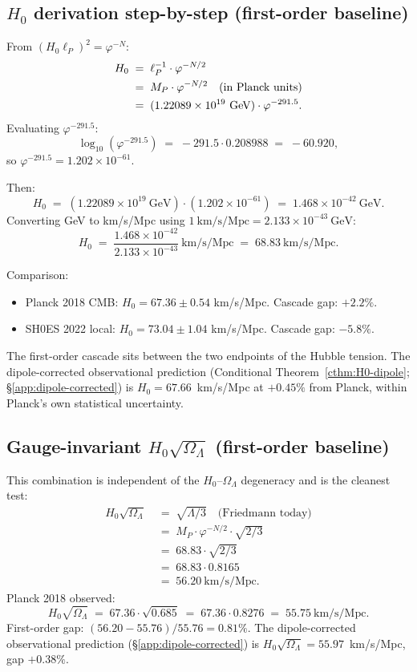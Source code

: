 \documentclass[11pt]{article}
\theoremstyle{plain}
\theoremstyle{definition}
\theoremstyle{remark}
\begin{document}
\subsection{$H_0$ derivation step-by-step (first-order baseline)}\label{app:h0-derivation}

From $(H_0 \ell_P)^2 = \varphi^{-N}$:
\begin{align}
  H_0 \;&=\; \ell_P^{-1} \cdot \varphi^{-N/2} \notag \\
       \;&=\; M_P \cdot \varphi^{-N/2} \quad \text{(in Planck units)} \notag \\
       \;&=\; (1.22089 \times 10^{19}~\text{GeV}) \cdot \varphi^{-291.5}. \label{eq:H0-derivation}
\end{align}
Evaluating $\varphi^{-291.5}$:
\[
  \log_{10}(\varphi^{-291.5}) \;=\; -291.5 \cdot 0.208988 \;=\; -60.920,
\]
so $\varphi^{-291.5} = 1.202 \times 10^{-61}$.

Then:
\[
  H_0 \;=\; (1.22089 \times 10^{19}~\text{GeV}) \cdot (1.202 \times 10^{-61}) \;=\; 1.468 \times 10^{-42}~\text{GeV}.
\]
Converting GeV to km/s/Mpc using $1~\text{km/s/Mpc} = 2.133 \times 10^{-43}~\text{GeV}$:
\[
  \boxed{\;H_0 \;=\; \frac{1.468 \times 10^{-42}}{2.133 \times 10^{-43}}~\text{km/s/Mpc} \;=\; 68.83~\text{km/s/Mpc}.\;}
\]

Comparison:
\begin{itemize}[leftmargin=2em]
\item Planck 2018 CMB: $H_0 = 67.36 \pm 0.54$ km/s/Mpc. Cascade gap: $+2.2\%$.
\item SH0ES 2022 local: $H_0 = 73.04 \pm 1.04$ km/s/Mpc. Cascade gap: $-5.8\%$.
\end{itemize}
The first-order cascade sits between the two endpoints of the Hubble tension. The dipole-corrected observational prediction (Conditional Theorem~\ref{cthm:H0-dipole}; \S\ref{app:dipole-corrected}) is $H_0 = 67.66$~km/s/Mpc at $+0.45\%$ from Planck, within Planck's own statistical uncertainty.

\subsection{Gauge-invariant $H_0 \sqrt{\Omega_\Lambda}$ (first-order baseline)}\label{app:H0sqrtOmega}

This combination is independent of the $H_0$--$\Omega_\Lambda$ degeneracy and is the cleanest test:
\begin{align*}
  H_0 \sqrt{\Omega_\Lambda} \;&=\; \sqrt{\Lambda/3} \quad\text{(Friedmann today)} \\
  \;&=\; M_P \cdot \varphi^{-N/2} \cdot \sqrt{2/3} \\
  \;&=\; 68.83 \cdot \sqrt{2/3} \\
  \;&=\; 68.83 \cdot 0.8165 \\
  \;&=\; 56.20~\text{km/s/Mpc.}
\end{align*}
Planck 2018 observed:
\[
  H_0 \sqrt{\Omega_\Lambda} \;=\; 67.36 \cdot \sqrt{0.685} \;=\; 67.36 \cdot 0.8276 \;=\; 55.75~\text{km/s/Mpc.}
\]
First-order gap: $(56.20 - 55.76)/55.76 = 0.81\%$. The dipole-corrected observational prediction (\S\ref{app:dipole-corrected}) is $H_0\sqrt{\Omega_\Lambda} = 55.97$~km/s/Mpc, gap $+0.38\%$. \checkmark
\end{document}
